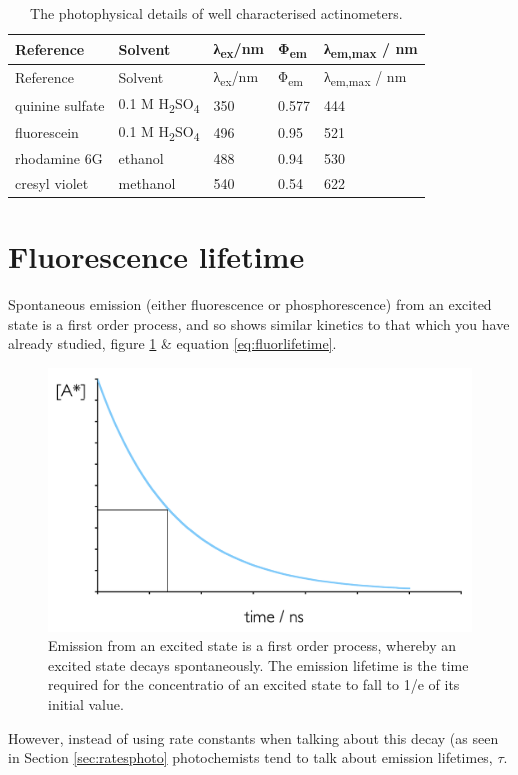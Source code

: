 \documentclass[
]{book}
\begin{document}
\begin{longtable}[]{@{}lllll@{}}
\caption{\label{tab:actinometer} The photophysical details of well characterised actinometers.}\tabularnewline
\toprule
Reference & Solvent & λ\textsubscript{ex}/nm & Φ\textsubscript{em} & λ\textsubscript{em,max} / nm\tabularnewline
\midrule
\endfirsthead
\toprule
Reference & Solvent & λ\textsubscript{ex}/nm & Φ\textsubscript{em} & λ\textsubscript{em,max} / nm\tabularnewline
\midrule
\endhead
quinine sulfate & 0.1 M H\textsubscript{2}SO\textsubscript{4} & 350 & 0.577 & 444\tabularnewline
fluorescein & 0.1 M H\textsubscript{2}SO\textsubscript{4} & 496 & 0.95 & 521\tabularnewline
rhodamine 6G & ethanol & 488 & 0.94 & 530\tabularnewline
cresyl violet & methanol & 540 & 0.54 & 622\tabularnewline
\bottomrule
\end{longtable}

\hypertarget{fluorescence-lifetime}{%
\section{Fluorescence lifetime}\label{fluorescence-lifetime}}

Spontaneous emission (either fluorescence or phosphorescence) from an excited state is a first order process, and so shows similar kinetics to that which you have already studied, figure \ref{fig:fluorlifetime} \& equation \eqref{eq:fluorlifetime}.

\begin{figure}

{\centering \includegraphics[width=0.5\linewidth]{images/fluorlifetime} 

}

\caption{Emission from an excited state is a first order process, whereby an excited state decays spontaneously. The emission lifetime is the time required for the concentratio of an excited state to fall to 1/e of its initial value.}\label{fig:fluorlifetime}
\end{figure}

However, instead of using rate constants when talking about this decay (as seen in Section \ref{sec:ratesphoto} photochemists tend to talk about emission lifetimes, \(\tau\).
\end{document}
